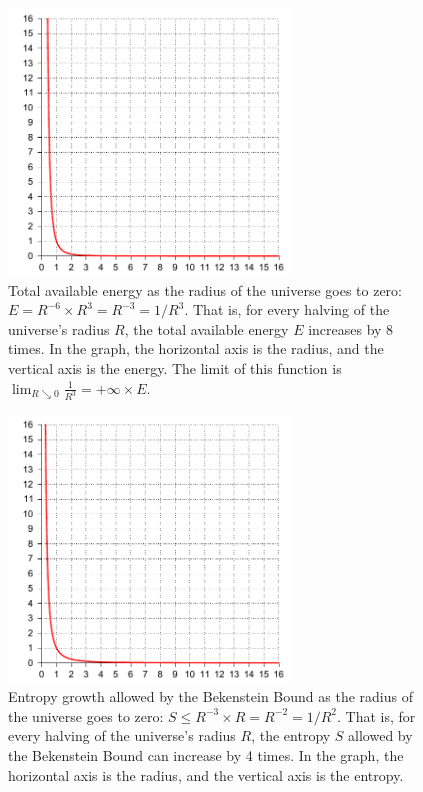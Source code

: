 \documentclass[letterpaper,12pt]{article}
\begin{document}
\begin{figure}[htbp]
  \centering
    \includegraphics[width=0.66666667\textwidth]{Universe-Energy.pdf}
  \caption[Available Energy During the Universe's Collapse]{Total available energy as the radius of the universe goes to zero: \( E = R^{-6}\times R^3 = R^{-3} = 1/R^3 \). That is, for every halving of the universe's radius \( R \), the total available energy \( E \) increases by 8 times. In the graph, the horizontal axis is the radius, and the vertical axis is the energy. The limit of this function is \( \lim_{R\searrow 0}\frac{1}{R^3} = +\infty\times E \).}
  \label{fig:Universe-Energy.pdf}
\end{figure}

\begin{figure}[htbp]
  \centering
    \includegraphics[width=0.66666667\textwidth]{Universe-Entropy.pdf}
  \caption[Entropy Growth Allowed During the Universe's Collapse]{Entropy growth allowed by the Bekenstein Bound as the radius of the universe goes to zero: \( S \leq R^{-3}\times R = R^{-2} = 1/R^2 \). That is, for every halving of the universe's radius \( R \), the entropy \( S \) allowed by the Bekenstein Bound can increase by 4 times. In the graph, the horizontal axis is the radius, and the vertical axis is the entropy.}
  \label{fig:Universe-Entropy.pdf}
\end{figure}
\end{document}

